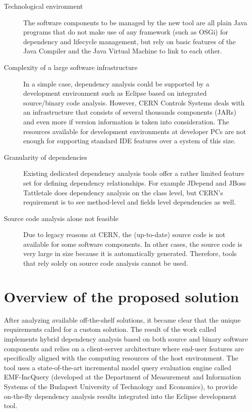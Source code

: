 \begin{description}
\item[Technological environment] The software components to be managed by the
new tool are all plain Java programs that do not make use of any framework (such
as OSGi) for dependency and lifecycle management, but rely on basic
features of the Java Compiler and the Java Virtual Machine to link to each
other.
 
\item[Complexity of a large software infrastructure] In a simple case,
dependency analysis could be supported by a development environment such as
Eclipse based on integrated source/binary code analysis. However, CERN Controls
Systems deals with an infrastructure that consists of several thousands
components (JARs) and even more if version information is taken into
consideration. The resources available for development environments at developer
PCs are not enough for supporting standard IDE features over a system of this
size.
 
\item[Granularity of dependencies] Existing dedicated dependency analysis
tools offer a rat\-her limited feature set for defining dependency relationships.
For example JDepend \cite{JDepend} and JBoss Tattletale \cite{Tattletale} does
dependency analysis on the class level, but CERN's requirement is to see
method-level and fields level dependencies as well.

\item[Source code analysis alone not feasible] Due to legacy reasons at CERN,
the (up-to-date) source code is not available for some software components. In
other cases, the source code is very large in size because it is automatically
generated. Therefore, tools that rely solely on source code analysis cannot be
used.

\end{description}

\section{Overview of the proposed solution}
After analyzing available off-the-shelf solutions, it became clear that the
unique requirements called for a custom solution. The result of the work called
\ptool{} implements hybrid dependency analysis based on both source and binary
software components and relies on a client-server architecture where end-user
features are specifically aligned with the computing resources of the host
environment. The tool uses a state-of-the-art incremental model query evaluation
engine called EMF-IncQuery (developed at the Department of Measurement and
Information Systems of the Budapest University of Technology and Economics), to
provide on-the-fly dependency analysis results integrated into the Eclipse
development tool.

